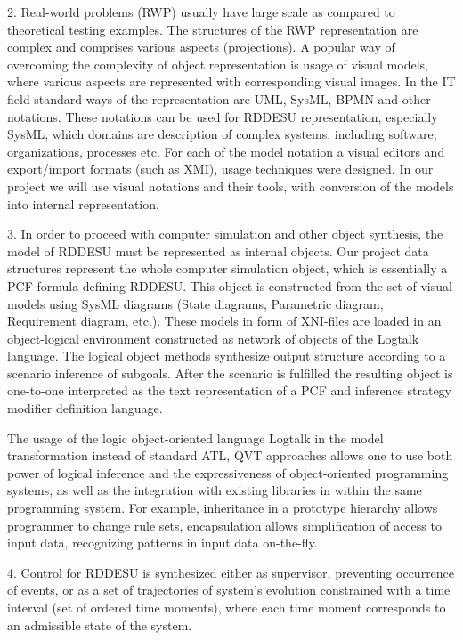 \documentclass[runningheads]{llncs}
\begin{document}
2. Real-world problems (RWP) usually have large scale as compared to theoretical testing examples. The structures of the RWP representation are complex and comprises various aspects (projections). A popular way of overcoming the complexity of object representation is usage of visual models, where various aspects are represented with corresponding visual images. In the IT field standard ways of the representation are UML, SysML, BPMN and other notations. These notations can be used for RDDESU representation, especially SysML, which domains are description of complex systems, including software, organizations, processes etc. For each of the model notation a visual editors and export/import formats (such as XMI), usage techniques were designed. In our project we will use visual notations and their tools, with conversion of the models into internal representation.

3. In order to proceed with computer simulation and other object synthesis, the model of RDDESU must be represented as internal objects. Our project data structures represent the whole computer simulation object, which is essentially a PCF formula defining RDDESU. This object is constructed from the set of visual models using SysML  diagrams (State diagrams, Parametric diagram, Requirement diagram, etc.). These models in form of XNI-files are loaded in an object-logical environment constructed as network of objects of the Logtalk language. The logical object methods synthesize output structure according to a scenario inference of subgoals. After the scenario is fulfilled the resulting object is one-to-one interpreted as the text representation of a PCF and inference strategy modifier definition language.

The usage of the logic object-oriented language Logtalk in the model transformation instead of standard ATL, QVT approaches  allows one to use both power of logical inference and the expressiveness of object-oriented programming systems, as well as the integration with existing libraries in within the same programming system. For example, inheritance in a prototype hierarchy allows programmer to change rule sets, encapsulation allows simplification of access to input data, recognizing patterns in input data on-the-fly.

4. Control for RDDESU is synthesized either as supervisor, preventing occurrence of events, or as a set of trajectories of system’s evolution constrained with a time interval (set of ordered time moments), where each time moment corresponds to an admissible state of the system.
\end{document}
